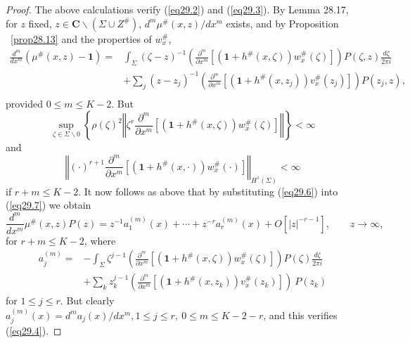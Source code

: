 \documentclass{surv-l}
\theoremstyle{plain}
\theoremstyle{definition}
\numberwithin{equation}{chapter}
\begin{document}
\begin{proof}
The above calculations verify (\ref{eq29.2}) and (\ref{eq29.3}). By Lemma 28.17, for $z$ fixed, $z\in \mathbf{C}\backslash (\Sigma\cup Z^{\#})$, $d^{m}\mu^{\#}(x, z)/dx^{m}$ exists, and by Proposition ~\ref{prop28.13} and the properties of $w_{x}^{\#}$,
\begin{align}\label{eq29.7}
\frac{d^{m}}{dx^{m}}(\mu^{\#} (x, z)-\mathbf{1})=&\int_{\Sigma}(\zeta-z)^{-1}\left(\frac{\partial^{m}}{\partial x^{m}}[(\mathbf{1}+h^{\#}(x, \zeta))w_{x}^{\#}(\zeta)]\right)P(\zeta,z)\frac{d{\zeta}}{2\pi i}\\\nonumber
&+\sum_{j}(z-z_{j})^{-1}\left(\frac{\partial^{m}}{\partial x^{m}}[(\mathbf{1}+h^{\#}(x, z_{j}))v_{x}^{\#}(z_{j})]\right)P(z_{j},z),\,\\ \nonumber
\end{align}
provided $0\leq m\leq K-2$. But
\begin{equation*}
\sup_{\zeta\in\Sigma\backslash 0}\left\{\rho(\zeta)^{2}\left\Vert\zeta^{r}\frac{\partial^{m}}{\partial x^{m}}[(\mathbf{1}+h^{\#}(x, \zeta))w_{x}^{\#}(\zeta)]\right\Vert\right\}<\infty
\end{equation*}
and
\begin{equation*}
\left\Vert(\cdot)^{r+1}\frac{\partial^{m}}{\partial x^{m}}[(\mathbf{1}+h^{\#}(x, \cdot))w_{x}^{\#}(\cdot)]\right\Vert_{H^{1}(\Sigma)}<\infty
\end{equation*}
if $r+m\leq K-2$. It now follows as above that by substituting (\ref{eq29.6}) into (\ref{eq29.7}) we obtain
\begin{equation*}
\frac{d^{m}}{dx^{m}}\mu^{\#} (x, z)P(z)=z^{-1}a_{1}^{(m)}(x)+\cdots +z^{-r}a_{r}^{(m)}(x)+O[|z|^{-r-1}],\qquad  z\rightarrow\infty,
\end{equation*}
for $r+m\leq K-2$, where
\begin{align*}
a_{j}^{(m)}=&-\int_{\Sigma}\zeta^{j-1}\left(\frac{\partial^{m}}{\partial x^{m}}[(\mathbf{1}+h^{\#} (x, \zeta))w_{x}^{\#}(\zeta)]\right)P(\zeta)\frac{d \zeta}{2\pi i}\\
&+\sum_{k}z_{k}^{j-1}\left(\frac{\partial^{m}}{\partial x^{m}}[(\mathbf{1}+h^{\#}(x, z_{k}))v_{x}^{\#}(z_{k})]\right)\ P(z_{k})
\end{align*}
for $1\leq j\leq r$. But clearly $a_{j}^{(m)}(x)=d^{m}a_{j}(x)/dx^{m},1\leq j\leq r,\ 0\leq m\leq K-2-r$, and this verifies (\ref{eq29.4}).


\end{proof}
\end{document}
